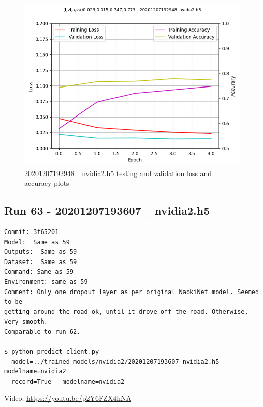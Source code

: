 \begin{figure}[ht]
\centering
\includegraphics[width=\textwidth]{Figures/20201207192948_nvidia2_accuracy.png}
\caption{20201207192948\_ nvidia2.h5 testing and validation loss and accuracy plots}
\label{fig:20201207192948_nvidia2_accuracy}
\end{figure}

\subsection{Run 63 - 20201207193607\_ nvidia2.h5}
\label{app_res:63}
\begin{verbatim}
Commit: 3f65201
Model:  Same as 59
Outputs:  Same as 59
Dataset:  Same as 59
Command: Same as 59
Environment: same as 59 
Comment: Only one dropout layer as per original NaokiNet model. Seemed to be
getting around the road ok, until it drove off the road. Otherwise, Very smooth.
Comparable to run 62.

$ python predict_client.py 
--model=../trained_models/nvidia2/20201207193607_nvidia2.h5 --modelname=nvidia2 
--record=True --modelname=nvidia2

\end{verbatim}
Video: \url{https://youtu.be/p2Y6FZX4hNA}

